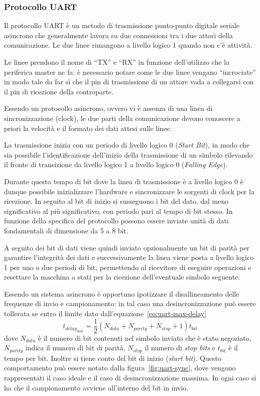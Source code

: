\subsubsection{Protocollo UART}

Il protocollo UART è un metodo di trasmissione punto-punto digitale seriale asincrono che generalmente lavora su due connessioni tra i due attori della comunicazione. Le due linee rimangono a livello logico 1 quando non c'è attività.

Le linee prendono il nome di ``TX'' e ``RX'' in funzione dell'utilizzo che la periferica master ne fa: è necessario notare come le due linee vengano ``incrociate'' in modo tale da far sì che il pin di trasmissione di un attore vada a collegarsi con il pin di ricezione della controparte.

Essendo un protocollo asincrono, ovvero vi è assenza di una linea di sincronizzazione (clock), le due parti della comunicazione devono conoscere a priori la velocità e il formato dei dati attesi sulle linee.

La trasmissione inizia con un periodo di livello logico 0 (\textit{Start Bit}), in modo che sia possibile l'identificazione dell'inizio della trasmissione di un simbolo rilevando il fronte di transizione da livello logico 1 a livello logico 0 (\textit{Falling Edge}).

Durante questo tempo di bit dove la linea di trasmissione è a livello logico 0 è dunque possibile inizializzare l'hardware e sincronizzare le sorgenti di clock per la ricezione. In seguito al bit di inizio si susseguono i bit del dato, dal meno significativo al più significativo, con periodo pari al tempo di bit stesso. In funzione della specifica del protocollo possono essere inviate unità di dati fondamentali di dimensione da 5 a 8 bit.

A seguito dei bit di dati viene quindi inviato opzionalmente un bit di parità per garantire l'integrità dei dati e successivamente la linea viene posta a livello logico 1 per uno o due periodi di bit, permettendo al ricevitore di eseguire operazioni e resettare la macchina a stati per la ricezione dell'eventuale simbolo seguente.\cite{site:rs-uart}

Essendo un sistema asincrono è opportuno ipotizzare il disallineamento delle frequenze di invio e campionamento: in tal caso una desincronizzazione può essere tollerata se entro il limite dato dall'equazione~\ref{eq:uart-max-delay}
\begin{equation}\label{eq:uart-max-delay}
    t_{delay_{\max}} = \frac{1}{2}(N_{data}+N_{parity}+N_{stop}+1)t_{bit}    
\end{equation}
dove \(N_{data}\) è il numero di bit contenuti nel simbolo inviato che è stato negoziato, \(N_{parity}\) indica il numero di bit di parità, \(N_{stop}\) il numero di \textit{stop bits} e \(t_{bit}\) è il tempo per bit. Inoltre si tiene conto del bit di inizio (\textit{start bit}). Questo comportamento può essere notato dalla figura~\ref{fig:uart-sync}, dove vengono rappresentati il caso ideale e il caso di desincronizzazione massima. In ogni caso si ha che il campionamento avviene all'interno del bit in invio.

